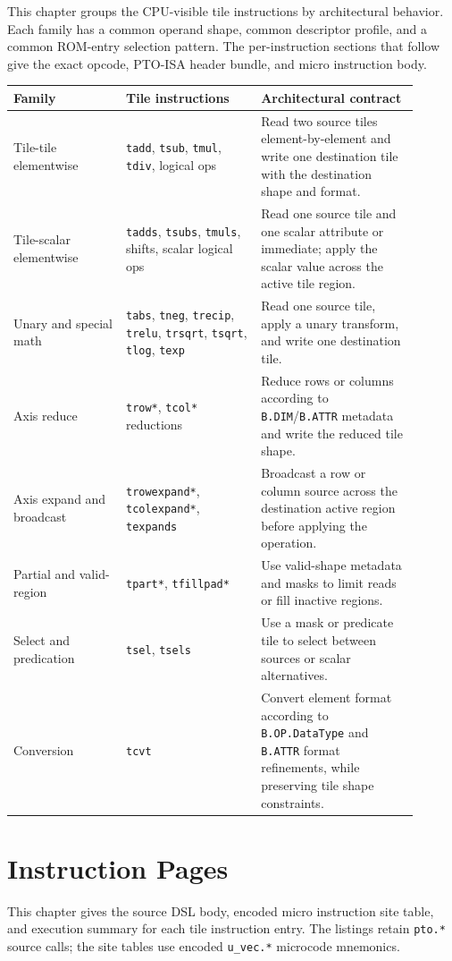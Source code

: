 This chapter groups the CPU-visible tile instructions by architectural behavior. Each family has a common operand shape, common descriptor profile, and a common ROM-entry selection pattern. The per-instruction sections that follow give the exact opcode, PTO-ISA header bundle, and micro instruction body.
\begin{longtable}{@{}L{0.25\linewidth}L{0.30\linewidth}L{0.35\linewidth}@{}}
\toprule
Family & Tile instructions & Architectural contract \\
\midrule
Tile-tile elementwise & \texttt{tadd}, \texttt{tsub}, \texttt{tmul}, \texttt{tdiv}, logical ops & Read two source tiles element-by-element and write one destination tile with the destination shape and format. \\
Tile-scalar elementwise & \texttt{tadds}, \texttt{tsubs}, \texttt{tmuls}, shifts, scalar logical ops & Read one source tile and one scalar attribute or immediate; apply the scalar value across the active tile region. \\
Unary and special math & \texttt{tabs}, \texttt{tneg}, \texttt{trecip}, \texttt{trelu}, \texttt{trsqrt}, \texttt{tsqrt}, \texttt{tlog}, \texttt{texp} & Read one source tile, apply a unary transform, and write one destination tile. \\
Axis reduce & \texttt{trow*}, \texttt{tcol*} reductions & Reduce rows or columns according to \texttt{B.DIM}/\texttt{B.ATTR} metadata and write the reduced tile shape. \\
Axis expand and broadcast & \texttt{trowexpand*}, \texttt{tcolexpand*}, \texttt{texpands} & Broadcast a row or column source across the destination active region before applying the operation. \\
Partial and valid-region & \texttt{tpart*}, \texttt{tfillpad*} & Use valid-shape metadata and masks to limit reads or fill inactive regions. \\
Select and predication & \texttt{tsel}, \texttt{tsels} & Use a mask or predicate tile to select between sources or scalar alternatives. \\
Conversion & \texttt{tcvt} & Convert element format according to \texttt{B.OP.DataType} and \texttt{B.ATTR} format refinements, while preserving tile shape constraints. \\
\bottomrule
\end{longtable}

\section{Instruction Pages}
This chapter gives the source DSL body, encoded micro instruction site table, and execution summary for each tile instruction entry. The listings retain \texttt{pto.*} source calls; the site tables use encoded \texttt{u\_vec.*} microcode mnemonics.

